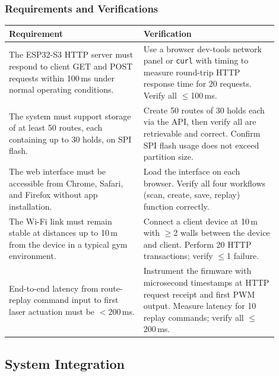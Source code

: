 \documentclass[12pt]{extarticle}
\begin{document}
\subsubsection{Requirements and Verifications}

\begin{longtable}{>{\raggedright\arraybackslash}p{0.45\linewidth}
                  >{\raggedright\arraybackslash}p{0.45\linewidth}}
\toprule
\textbf{Requirement} & \textbf{Verification} \\
\midrule
\endhead
\bottomrule
\endfoot

The ESP32-S3 HTTP server must respond to client GET and POST requests within 100\,ms under
normal operating conditions. &
Use a browser dev-tools network panel or \texttt{curl} with timing to measure round-trip HTTP
response time for 20 requests. Verify all $\leq$100\,ms. \\
\addlinespace

The system must support storage of at least 50 routes, each containing up to 30 holds, on
SPI flash. &
Create 50 routes of 30 holds each via the API, then verify all are retrievable and correct.
Confirm SPI flash usage does not exceed partition size. \\
\addlinespace

The web interface must be accessible from Chrome, Safari, and Firefox without app installation. &
Load the interface on each browser. Verify all four workflows (scan, create, save, replay)
function correctly. \\
\addlinespace

The Wi-Fi link must remain stable at distances up to 10\,m from the device in a typical gym
environment. &
Connect a client device at 10\,m with $\geq$2 walls between the device and client. Perform
20 HTTP transactions; verify $\leq$1 failure. \\
\addlinespace

End-to-end latency from route-replay command input to first laser actuation must be
$<$200\,ms. &
Instrument the firmware with microsecond timestamps at HTTP request receipt and first PWM
output. Measure latency for 10 replay commands; verify all $\leq$200\,ms. \\
\end{longtable}

\subsection{System Integration}
\end{document}
